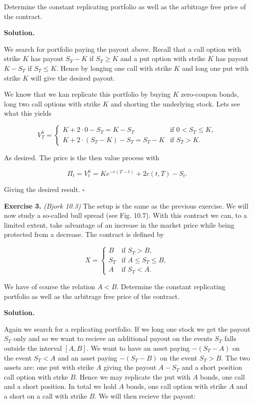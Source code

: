 \documentclass[
]{book}
\begin{document}
Determine the constant replicating portfolio as well as the arbitrage free price of the contract.

\textbf{Solution.}

We search for portfolio paying the payout above. Recall that a call option with strike \(K\) has payout \(S_T-K\) if \(S_T\ge K\) and a put option with strike \(K\) has payout \(K-S_T\) if \(S_T\le K\). Hence by longing one call with strike \(K\) and long one put with strike \(K\) will give the desired payout.

We know that we kan replicate this portfolio by buying \(K\) zero-coupon bonds, long two call options with strike \(K\) and shorting the underlying stock. Lets see what this yields

\[
V_T^h =
\begin{cases}
  K+2\cdot 0-S_T=K-S_T & \text{if }0<S_T\le K,\\
  K+2\cdot(S_T-K)-S_T=S_T-K & \text{if }S_T>K.
\end{cases}
\]

As desired. The price is the then value process with

\[
\Pi_t=V_t^h=Ke^{-r(T-t)}+2c(t,T)-S_t.
\]

Giving the desired result. \(\square\)

\textbf{Exercise 3.} \emph{(Bjork 10.3)} The setup is the same as the previous exercise. We will now study a so-called bull spread (see Fig. 10.7). With this contract we can, to a limited extent, take advantage of an increase in the market price while being protected from a decrease. The contract is defined by

\[
X=
\begin{cases}
  B & \text{if }S_T>B,\\
  S_T & \text{if }A\le S_T\le B,\\
  A &\text{if }S_T< A.
\end{cases}
\]

We have of course the relation \(A<B\). Determine the constant replicating portfolio as well as the arbitrage free price of the contract.

\textbf{Solution.}

Again we search for a replicating portfolio. If we long one stock we get the payout \(S_T\) only and so we want to recieve an additional payout on the events \(S_T\) falls outside the interval \([A,B]\). We want to have an asset paying \(-(S_T-A)\) on the event \(S_T<A\) and an asset paying \(-(S_T-B)\) on the event \(S_T>B\). The two assets are: one put with strike \(A\) giving the payout \(A-S_T\) and a short position call option with strke \(B\). Hence we may replicate the put with \(A\) bonds, one call and a short position. In total we hold \(A\) bonds, one call option with strike \(A\) and a short on a call with strike \(B\). We will then recieve the payout:
\end{document}
